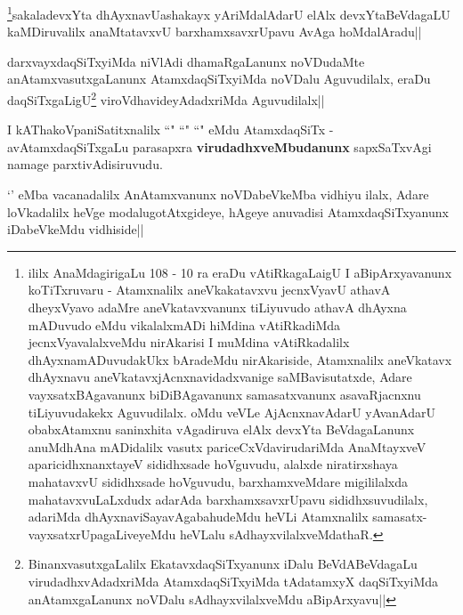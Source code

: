 
\begin{artha}
\footnote{ililx AnaMdagirigaLu 108 - 10 ra eraDu vAtiRkagaLaigU I aBipArxyavanunx koTiTxruvaru - Atamxnalilx aneVkakatavxvu jecnxVyavU athavA dheyxVyavo adaMre aneVkatavxvanunx tiLiyuvudo athavA dhAyxna mADuvudo eMdu vikalalxmADi hiMdina vAtiRkadiMda jecnxVyavalalxveMdu nirAkarisi I muMdina vAtiRkadalilx dhAyxnamADuvudakUkx bAradeMdu nirAkariside, Atamxnalilx aneVkatavx dhAyxnavu aneVkatavxjAcnxnavidadxvanige saMBavisutatxde, Adare vayxsatxBAgavanunx biDiBAgavanunx samasatxvanunx asavaRjacnxnu tiLiyuvudakekx Aguvudilalx. oMdu veVLe AjAcnxnavAdarU yAvanAdarU obabxAtamxnu saninxhita vAgadiruva elAlx devxYta BeVdagaLanunx anuMdhAna mADidalilx vasutx pariceCxVdavirudariMda AnaMtayxveV aparicidhxnanxtayeV sididhxsade hoVguvudu, alalxde niratirxshaya mahatavxvU sididhxsade hoVguvudu, barxhamxveMdare migililalxda mahatavxvuLaLxdudx adarAda barxhamxsavxrUpavu sididhxsuvudilalx, adariMda dhAyxnaviSayavAgabahudeMdu heVLi Atamxnalilx samasatx-vayxsatxrUpagaLiveyeMdu heVLalu sAdhayxvilalxveMdathaR.}sakaladevxYta dhAyxnavUashakayx yAriMdalAdarU elAlx devxYtaBeVdagaLU kaMDiruvalilx anaMtatavxvU barxhamxsavxrUpavu AvAga hoMdalAradu||
\end{artha}

\begin{artha}
darxvayxdaqSiTxyiMda niVlAdi dhamaRgaLanunx noVDudaMte anAtamxvasutxgaLanunx AtamxdaqSiTxyiMda noVDalu Aguvudilalx, eraDu daqSiTxgaLigU\footnote{BinanxvasutxgaLalilx EkatavxdaqSiTxyanunx iDalu BeVdABeVdagaLu virudadhxvAdadxriMda AtamxdaqSiTxyiMda tAdatamxyX daqSiTxyiMda anAtamxgaLanunx noVDalu sAdhayxvilalxveMdu aBipArxyavu||} viroVdhavideyAdadxriMda Aguvudilalx||
\end{artha}


\begin{artha}
I kAThakoVpaniSatitxnalilx ``\stext" ``\stext" ``\stext" eMdu AtamxdaqSiTx - avAtamxdaqSiTxgaLu parasapxra \textbf{virudadhxveMbudanunx} sapxSaTxvAgi namage parxtivAdisiruvudu.
\end{artha}


`\stext' eMba vacanadalilx AnAtamxvanunx noVDabeVkeMba vidhiyu ilalx, Adare loVkadalilx heVge modalugotAtxgideye, hAgeye anuvadisi AtamxdaqSiTxyanunx iDabeVkeMdu vidhiside||

